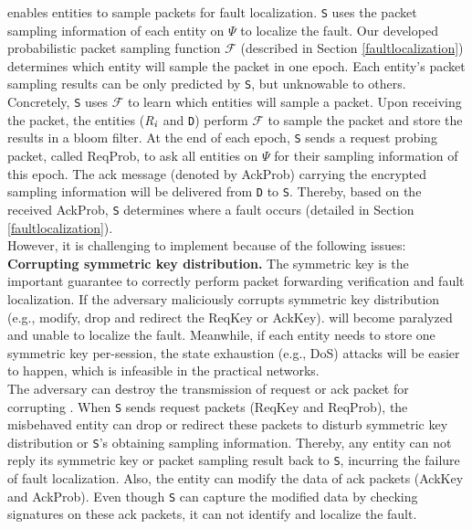 \name{} enables entities to sample packets for fault localization. {\tt S} uses the packet sampling information of each entity on $\Psi$ to localize the fault. Our developed probabilistic packet sampling function $\mathcal{F}$ (described in Section \ref{faultlocalization}) determines which entity will sample the packet in one epoch. Each entity's packet sampling results can be only predicted by {\tt S}, but unknowable to others. Concretely, {\tt S} uses $\mathcal{F}$ to learn which entities will sample a packet. Upon receiving the packet, the entities (\emph{R}$_\emph{i}$ and {\tt D}) perform $\mathcal{F}$ to sample the packet and store the results in a bloom filter. At the end of each epoch, {\tt S} sends a request probing packet, called ReqProb, to ask all entities on $\Psi$ for their sampling information of this epoch. The ack message (denoted by AckProb) carrying the encrypted sampling information will be delivered from {\tt D} to {\tt S}.
Thereby, based on the received AckProb, {\tt S} determines where a fault occurs (detailed in Section \ref{faultlocalization}).\\
\indent
However, %
it is challenging to implement \name{} because of the following issues:\\
\noindent \textbf{Corrupting symmetric key distribution.} The symmetric key is the important guarantee to correctly perform packet forwarding verification and fault localization. If the adversary maliciously corrupts symmetric key distribution (e.g., modify, drop and redirect the ReqKey or AckKey). \name{} will become paralyzed and unable to localize the fault. Meanwhile, if each entity needs to store one symmetric key per-session, the state exhaustion (e.g., DoS)  attacks will be easier to happen, which is infeasible in the practical networks.\\
 The adversary can destroy the transmission of request or ack packet for corrupting \name{}. When {\tt S} sends request packets (ReqKey and ReqProb), the misbehaved entity can drop or redirect these packets to disturb symmetric key distribution or {\tt S}'s obtaining sampling information. Thereby, any entity can not reply its symmetric key or packet sampling result back to {\tt S}, incurring the failure of fault localization. Also, the entity can modify the data of ack packets (AckKey and AckProb). Even though {\tt S} can capture the modified data by checking signatures on these ack packets, it can not identify and localize the fault.\\
